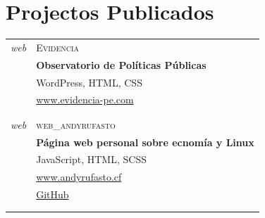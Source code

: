\documentclass[a4paper,10pt]{article}
\begin{document}
\section{Projectos Publicados}
\vspace{5mm}

\begin{tabular}{r|p{11cm}}
  \emph{web}  & \textsc{Evidencia}\\
	& \textbf{Observatorio de Políticas Públicas} \\
	& WordPress, HTML, CSS\\
	& \href{https://www.evidencia-pe.com}
                {www.evidencia-pe.com}\\
        &\footnotesize{}\\\multicolumn{2}{c}{} \\
        
  \emph{web} & \textsc{web\_andyrufasto}\\
	& \textbf{Página web personal sobre ecnomía y Linux} \\
	& JavaScript, HTML, SCSS\\
	& \href{https://www.andyrufasto.cf}{www.andyrufasto.cf}\\
	& \href{https://www.github.com/andyrufasto/web_andyrufasto}{GitHub}\\
        &\footnotesize{}\\\multicolumn{2}{c}{} \\


\end{tabular}
\end{document}
